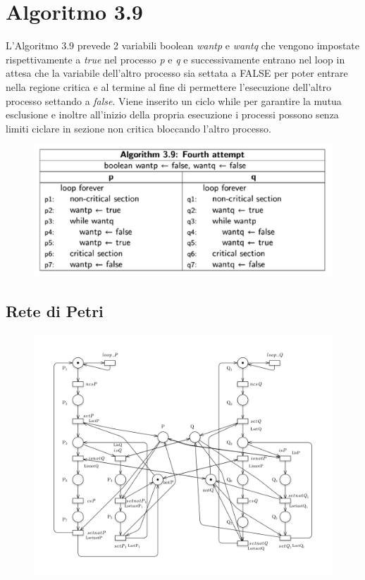 \documentclass{article}
\begin{document}
\section{Algoritmo 3.9}
L'Algoritmo 3.9 prevede 2 variabili boolean \textit{wantp} e \textit{wantq} che vengono impostate rispettivamente a \textit{true} nel processo \textit{p} e \textit{q} e successivamente entrano nel loop in attesa che la variabile dell'altro processo sia settata a FALSE per poter entrare nella regione critica e al termine al fine di permettere l'esecuzione dell'altro processo settando a \textit{false}. Viene inserito un ciclo while per garantire la mutua esclusione e inoltre all'inizio della propria esecuzione i processi possono senza limiti ciclare in sezione non critica bloccando l'altro processo. 
\begin{figure}[h] 
\centering
\includegraphics[scale=0.6]{3.9.png}
\end{figure}
\clearpage
\subsection{Rete di Petri}
\begin{figure}[h] 
\centering
\includegraphics[scale=0.3]{3.9PT.png}
\end{figure}
\end{document}
